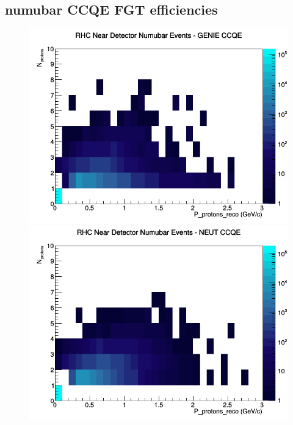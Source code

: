 \subsection{numubar CCQE FGT efficiencies}
\begin{figure}[h]
\includegraphics[width=\linewidth]{eff_N_P/FGT/protons/CCQE_RHC_ND_numubar_N_P_GENIE.png}
\endminipage
{}
\includegraphics[width=\linewidth]{eff_N_P/FGT/protons/CCQE_RHC_ND_numubar_N_P_NEUT.png}
\endminipage
{}

\end{figure}

